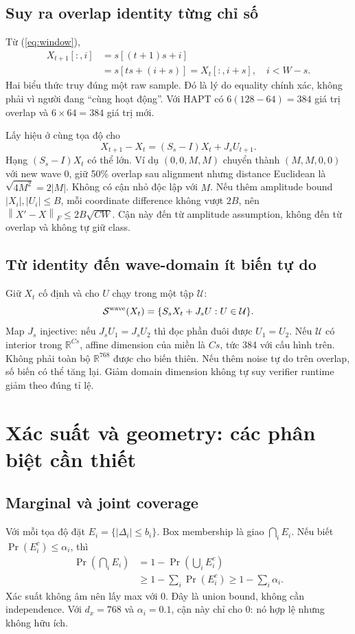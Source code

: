 \documentclass[11pt,a4paper]{article}
\newcommand{\R}{\mathbb R}
\newcommand{\norm}[1]{\left\lVert#1\right\rVert}
\newcommand{\Sset}{\mathcal S}
\newcommand{\Uset}{\mathcal U}
\theoremstyle{definition}
\begin{document}
\subsection{Suy ra overlap identity từng chỉ số}
Từ (\ref{eq:window}),
\begin{align}
X_{t+1}[:,i]&=s[(t+1)s+i]\\
&=s[ts+(i+s)]=X_t[:,i+s],\quad i<W-s.
\end{align}
Hai biểu thức truy đúng một raw sample. Đó là lý do equality chính xác,
không phải vì người đang ``cùng hoạt động''. Với HAPT có $6(128-64)=384$
giá trị overlap và $6\times64=384$ giá trị mới.

Lấy hiệu ở cùng tọa độ cho
\begin{equation}
X_{t+1}-X_t=(S_s-I)X_t+J_sU_{t+1}.
\end{equation}
Hạng $(S_s-I)X_t$ có thể lớn. Ví dụ $(0,0,M,M)$ chuyển thành
$(M,M,0,0)$ với new wave 0, giữ 50\% overlap sau alignment nhưng distance
Euclidean là $\sqrt{4M^2}=2|M|$. Không có cận nhỏ độc lập với $M$.
Nếu thêm amplitude bound $|X_i|,|U_i|\le B$, mỗi coordinate difference
không vượt $2B$, nên $\norm{X'-X}_F\le2B\sqrt{CW}$. Cận này đến từ
amplitude assumption, không đến từ overlap và không tự giữ class.

\subsection{Từ identity đến wave-domain ít biến tự do}
Giữ $X_t$ cố định và cho $U$ chạy trong một tập $\Uset$:
\begin{equation}
\Sset^{\rm wave}(X_t)=\{S_sX_t+J_sU:U\in\Uset\}.
\label{eq:wave-domain}
\end{equation}
Map $J_s$ injective: nếu $J_sU_1=J_sU_2$ thì đọc phần đuôi được $U_1=U_2$.
Nếu $\Uset$ có interior trong $\R^{Cs}$, affine dimension của miền là
$Cs$, tức 384 với cấu hình trên. Không phải toàn bộ $\R^{768}$ được cho
biến thiên. Nếu thêm noise tự do trên overlap, số biến có thể tăng lại.
Giảm domain dimension không tự suy verifier runtime giảm theo đúng tỉ lệ.

\section{Xác suất và geometry: các phân biệt cần thiết}
\subsection{Marginal và joint coverage}
Với mỗi tọa độ đặt $E_i=\{|\Delta_i|\le b_i\}$. Box membership là giao
$\bigcap_iE_i$. Nếu biết $\Pr(E_i^c)\le\alpha_i$, thì
\begin{align}
\Pr\left(\bigcap_iE_i\right)
&=1-\Pr\left(\bigcup_iE_i^c\right)\\
&\ge1-\sum_i\Pr(E_i^c)\ge1-\sum_i\alpha_i.
\end{align}
Xác suất không âm nên lấy max với 0. Đây là union bound, không cần
independence. Với $d_x=768$ và $\alpha_i=0.1$, cận này chỉ cho 0: nó hợp
lệ nhưng không hữu ích.
\end{document}
